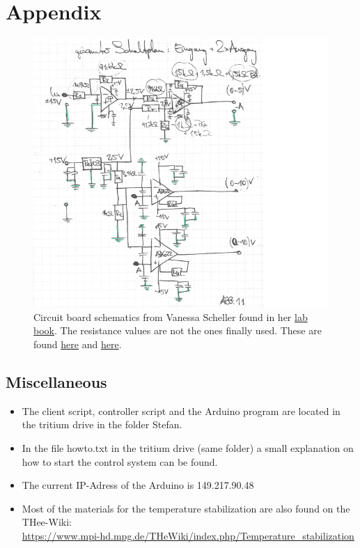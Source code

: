 \documentclass[12pt]{scrartcl}
\begin{document}
  \newpage
  \section{Appendix}
    \begin{figure}[H]
      \centering
      \includegraphics[width = \textwidth]{schaltplanvan.png}
      \caption{Circuit board schematics from Vanessa Scheller found in her
      \href{https://www.mpi-hd.mpg.de/THeWiki/index.php/Temperature_stabilization}{lab book}.
      The resistance values are not the ones finally used. These are found
      \hyperref[hcres]{here} and \hyperref[tempres]{here}.}
      \label{fig20}
    \end{figure}
    \subsection{Miscellaneous}
      \begin{itemize}
        \item The client script, controller script and the Arduino program are located in
              the tritium drive in the folder Stefan.
        \item In the file howto.txt in the tritium drive (same folder) a small explanation
              on how to start the control system can be found.
        \item The current IP-Adress of the Arduino is 149.217.90.48
        \item Most of the materials for the temperature stabilization
              are also found on the THee-Wiki: \\
              \url{https://www.mpi-hd.mpg.de/THeWiki/index.php/Temperature_stabilization}
      \end{itemize}
\end{document}

